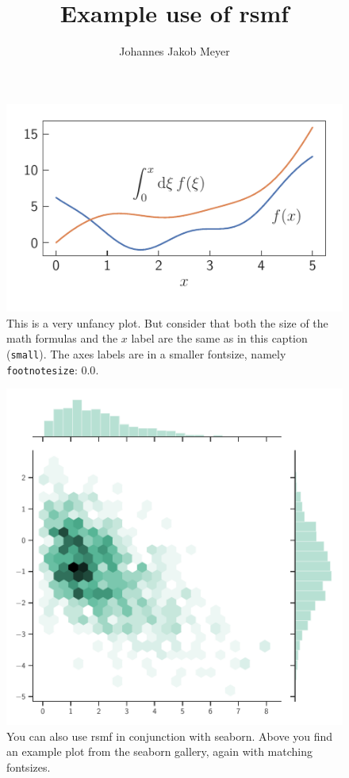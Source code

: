 \documentclass[a4paper,12pt]{quantumarticle}
\title{Example use of rsmf}
\author{Johannes Jakob Meyer}
\begin{document}
\maketitle

\lipsum[1-3]

\begin{figure}
	\centering
	\includegraphics{annotated_plot}
	\caption{This is a very unfancy plot. But consider that both the size of the math formulas and the $x$ label are the same as in this caption (\texttt{small}). The axes labels are in a smaller fontsize, namely \texttt{footnotesize}: {\footnotesize 0.0}.}
\end{figure}

\lipsum[11-16]

\begin{figure}
	\centering
	\includegraphics{hexbin}
	\caption{You can also use rsmf in conjunction with seaborn. Above you find an example plot from the seaborn gallery, again with matching fontsizes.}
\end{figure}
\end{document}
